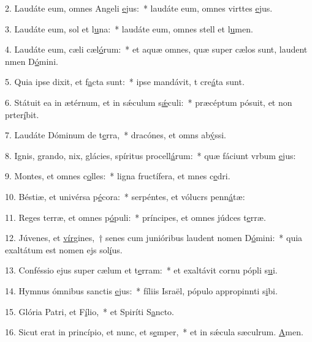 2. Laudáte eum, omnes Angeli \uline{e}jus:~* laudáte eum, omnes virttes \uline{e}jus.\par 
3. Laudáte eum, sol et l\uline{u}na:~* laudáte eum, omnes stell et l\uline{u}men.\par 
4. Laudáte eum, cæli cæl\uline{ó}rum:~* et aquæ omnes, quæ super cælos sunt, laudent nmen D\uline{ó}mini.\par 
5. Quia ipse dixit, et f\uline{a}cta sunt:~* ipse mandávit, t cre\uline{á}ta sunt.\par 
6. Státuit ea in ætérnum, et in sǽculum s\uline{ǽ}culi:~* præcéptum pósuit, et non prter\uline{í}bit.\par 
7. Laudáte Dóminum de t\uline{e}rra,~* dracónes, et omns ab\uline{ý}ssi.\par 
8. Ignis, grando, nix, glácies, spíritus procell\uline{á}rum:~* quæ fáciunt vrbum \uline{e}jus:\par 
9. Montes, et omnes c\uline{o}lles:~* ligna fructífera, et mnes c\uline{e}dri.\par 
10. Béstiæ, et univérsa p\uline{é}cora:~* serpéntes, et vólucrs penn\uline{á}tæ:\par 
11. Reges terræ, et omnes p\uline{ó}puli:~* príncipes, et omnes júdces t\uline{e}rræ.\par 
12. Júvenes, et \uline{vír}gines,~† senes cum junióribus laudent nomen D\uline{ó}mini:~* quia exaltátum est nomen ejs sol\uline{í}us.\par 
13. Conféssio ejus super cælum et t\uline{e}rram:~* et exaltávit cornu pópli s\uline{u}i.\par 
14. Hymnus ómnibus sanctis \uline{e}jus:~* fíliis Israël, pópulo appropinnti s\uline{i}bi.\par 
15. Glória Patri, et F\uline{í}lio,~* et Spiríti S\uline{a}ncto.\par 
16. Sicut erat in princípio, et nunc, et s\uline{e}mper,~* et in sǽcula sæculrum. \uline{A}men.\par 
